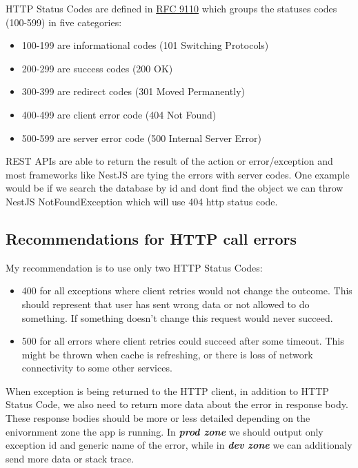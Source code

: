 \documentclass[lang=en,color=green]{elegantbook}
\newcommand{\bi}[1]{\textit{\textbf{#1}}}
\begin{document}
HTTP Status Codes are defined in \href{https://httpwg.org/specs/rfc9110.html#overview.of.status.codes}{RFC 9110}
which groups the statuses codes (100-599) in five categories:
\begin{itemize}
    \item 100-199 are informational codes (101 Switching Protocols)
    \item 200-299 are success codes (200 OK)
    \item 300-399 are redirect codes (301 Moved Permanently)
    \item 400-499 are client error code (404 Not Found)
    \item 500-599 are server error code (500 Internal Server Error)
\end{itemize}

REST APIs are able to return the result of the action or error/exception
and most frameworks like NestJS are tying the errors with server codes.
One example would be if we search the database by id and dont find the
object we can throw NestJS NotFoundException which will use 404 http status code.

\subsection{Recommendations for HTTP call errors}

My recommendation is to use only two HTTP Status Codes:
\begin{itemize}
    \item 400 for all exceptions where client retries would not change the outcome.
          This should represent that user has sent wrong data or not allowed to do something.
          If something doesn't change this request would never succeed.
    \item 500 for all errors where client retries could succeed after some timeout.
          This might be thrown when cache is refreshing, or there is loss of network connectivity
          to some other services.
\end{itemize}

When exception is being returned to the HTTP client, in addition to HTTP Status Code,
we also need to return more data about the error in response body. These response
bodies should be more or less detailed depending on the enivornment zone the app is running.
In \bi{prod zone} we should output only exception id and generic name of the error,
while in \bi{dev zone} we can additionaly send more data or stack trace.
\end{document}
